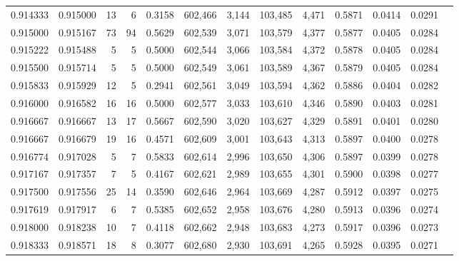 \begin{tabular}{rrrrrrrrrrrrr}
0.914333 & 0.915000 &    13 &   6 &                                     0.3158 & 602,466 &   3,144 & 103,485 &   4,471 & 0.5871 & 0.0414 & 0.0291 \\
0.915000 & 0.915167 &    73 &  94 &                                     0.5629 & 602,539 &   3,071 & 103,579 &   4,377 & 0.5877 & 0.0405 & 0.0284 \\
0.915222 & 0.915488 &     5 &   5 &                                     0.5000 & 602,544 &   3,066 & 103,584 &   4,372 & 0.5878 & 0.0405 & 0.0284 \\
0.915500 & 0.915714 &     5 &   5 &                                     0.5000 & 602,549 &   3,061 & 103,589 &   4,367 & 0.5879 & 0.0405 & 0.0284 \\
0.915833 & 0.915929 &    12 &   5 &                                     0.2941 & 602,561 &   3,049 & 103,594 &   4,362 & 0.5886 & 0.0404 & 0.0282 \\
0.916000 & 0.916582 &    16 &  16 &                                     0.5000 & 602,577 &   3,033 & 103,610 &   4,346 & 0.5890 & 0.0403 & 0.0281 \\
0.916667 & 0.916667 &    13 &  17 &                                     0.5667 & 602,590 &   3,020 & 103,627 &   4,329 & 0.5891 & 0.0401 & 0.0280 \\
0.916667 & 0.916679 &    19 &  16 &                                     0.4571 & 602,609 &   3,001 & 103,643 &   4,313 & 0.5897 & 0.0400 & 0.0278 \\
0.916774 & 0.917028 &     5 &   7 &                                     0.5833 & 602,614 &   2,996 & 103,650 &   4,306 & 0.5897 & 0.0399 & 0.0278 \\
0.917167 & 0.917357 &     7 &   5 &                                     0.4167 & 602,621 &   2,989 & 103,655 &   4,301 & 0.5900 & 0.0398 & 0.0277 \\
0.917500 & 0.917556 &    25 &  14 &                                     0.3590 & 602,646 &   2,964 & 103,669 &   4,287 & 0.5912 & 0.0397 & 0.0275 \\
0.917619 & 0.917917 &     6 &   7 &                                     0.5385 & 602,652 &   2,958 & 103,676 &   4,280 & 0.5913 & 0.0396 & 0.0274 \\
0.918000 & 0.918238 &    10 &   7 &                                     0.4118 & 602,662 &   2,948 & 103,683 &   4,273 & 0.5917 & 0.0396 & 0.0273 \\
0.918333 & 0.918571 &    18 &   8 &                                     0.3077 & 602,680 &   2,930 & 103,691 &   4,265 & 0.5928 & 0.0395 & 0.0271 \\

\end{tabular}
